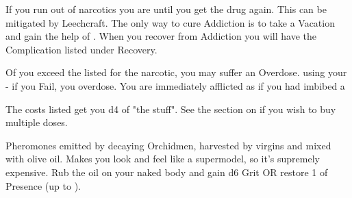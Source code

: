 {\begin{multicols}{2}
  If you run out of narcotics you are  until you get the drug again.  This can be mitigated by Leechcraft. The only way to cure Addiction is to take a Vacation and gain the help of .  When you recover from Addiction you will have the Complication listed under Recovery.


  Of you exceed the \MAX listed for the narcotic, you may suffer an Overdose.  \RS using your \VIG - if you Fail, you overdose.  You are immediately afflicted as if you had imbibed a 

  \cbreak




  The costs listed get you d4 \UD of "the stuff".  See the section on  if you wish to buy multiple doses.



  Pheromones emitted by decaying Orchidmen, harvested by virgins and mixed with olive oil.  Makes you look and feel like a supermodel, so it's supremely expensive.  Rub the oil on your naked body and gain d6 Grit OR restore 1 \UD of Presence (up to \MAX).


\end{multicols}}
